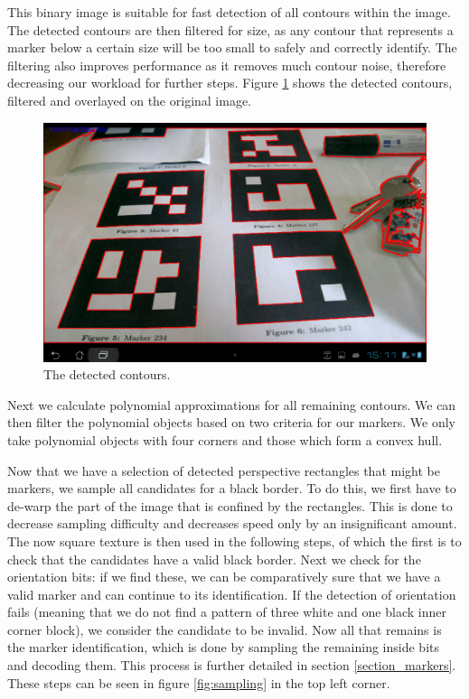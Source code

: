 This binary image is suitable for fast detection of all contours within the image.
The detected contours are then filtered for size, as any contour that represents a marker below a certain size will be too small to safely and correctly identify.
The filtering also improves performance as it removes much contour noise, therefore decreasing our workload for further steps.
Figure \ref{fig:contours} shows the detected contours, filtered and overlayed on the original image.

\begin{figure}[H]
	\centering
	\includegraphics[width=14cm]{img/contours.png}
	\caption[Contour Detection]{The detected contours.}
	\label{fig:contours}
\end{figure}

Next we calculate polynomial approximations for all remaining contours.
We can then filter the polynomial objects based on two criteria for our markers.
We only take polynomial objects with four corners and those which form a convex hull.

Now that we have a selection of detected perspective rectangles that might be markers, we sample all candidates for a black border.
To do this, we first have to de-warp the part of the image that is confined by the rectangles.
This is done to decrease sampling difficulty and decreases speed only by an insignificant amount.
The now square texture is then used in the following steps, of which the first is to check that the candidates have a valid black border.
Next we check for the orientation bits: if we find these, we can be comparatively sure that we have a valid marker and can continue to its identification.
If the detection of orientation fails (meaning that we do not find a pattern of three white and one black inner corner block), we consider the candidate to be invalid.
Now all that remains is the marker identification, which is done by sampling the remaining inside bits and decoding them.
This process is further detailed in section \ref{section_markers}.
These steps can be seen in figure \ref{fig:sampling} in the top left corner.

